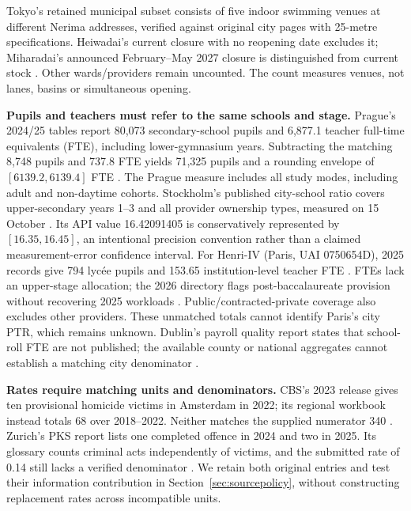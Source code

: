 Tokyo's retained municipal subset consists of five indoor swimming venues at different Nerima addresses, verified against original city pages with 25-metre specifications. Heiwadai's current closure with no reopening date excludes it; Miharadai's announced February--May 2027 closure is distinguished from current stock \cite{nerimapool,nerimaclose}. Other wards/providers remain uncounted. The count measures venues, not lanes, basins or simultaneous opening.

\textbf{Pupils and teachers must refer to the same schools and stage.}
Prague's 2024/25 tables report 80,073 secondary-school pupils and 6,877.1
teacher full-time equivalents (FTE), including lower-gymnasium years.
Subtracting the matching 8,748 pupils and 737.8 FTE yields 71,325 pupils and
a rounding envelope of $[6139.2,6139.4]$ FTE \cite{prague}. The Prague
measure includes all study modes, including adult and non-daytime cohorts.
Stockholm's
published city-school ratio covers upper-secondary years 1--3 and all provider
ownership types, measured on 15 October \cite{kolada}. Its API value
16.42091405 is conservatively represented by $[16.35,16.45]$, an intentional
precision convention rather than a claimed measurement-error confidence interval.
For Henri-IV (Paris, UAI 0750654D), 2025 records give 794 lyc\'ee pupils
and 153.65 institution-level teacher FTE \cite{deppmatch}. FTEs lack an
upper-stage allocation; the 2026 directory flags post-baccalaureate provision
without recovering 2025 workloads \cite{deppdirectory}. Public/contracted-private
coverage also excludes other providers. These unmatched totals cannot identify
Paris's city PTR, which remains unknown. Dublin's payroll quality report states that school-roll FTE are not published; the available county or national aggregates cannot establish a matching city denominator \cite{irelandfte}.

\textbf{Rates require matching units and denominators.}
CBS's 2023 release gives ten provisional homicide victims in Amsterdam in 2022;
its regional workbook instead totals 68 over 2018--2022. Neither matches the
supplied numerator 340 \cite{cbshomicide2022}. Zurich's PKS report lists one
completed offence in 2024 and two in 2025. Its glossary counts criminal acts
independently of victims, and the submitted rate of 0.14 still lacks a verified
denominator \cite{zhpks2025}. We retain both original entries and test their
information contribution in Section~\ref{sec:sourcepolicy}, without constructing
replacement rates across incompatible units.

